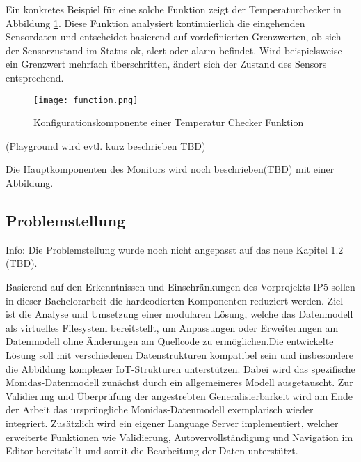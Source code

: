 Ein konkretes Beispiel für eine solche Funktion zeigt der Temperaturchecker in Abbildung \ref{fig:function}. Diese Funktion analysiert kontinuierlich die eingehenden Sensordaten und entscheidet basierend auf vordefinierten Grenzwerten, ob sich der Sensorzustand im Status ok, alert oder alarm befindet. Wird beispielsweise ein Grenzwert mehrfach überschritten, ändert sich der Zustand des Sensors entsprechend.

\begin{figure}[H]
  \centering
  \texttt{[image: function.png]}
  \caption{Konfigurationskomponente einer Temperatur Checker Funktion}
  \label{fig:function}
\end{figure}


(Playground wird evtl. kurz beschrieben TBD)

Die Hauptkomponenten des Monitors wird noch beschrieben(TBD) mit einer Abbildung. 



\subsection{Problemstellung}

Info: Die Problemstellung wurde noch nicht angepasst auf das neue Kapitel 1.2 (TBD).

Basierend auf den Erkenntnissen und Einschränkungen des Vorprojekts IP5 sollen in dieser Bachelorarbeit die hardcodierten Komponenten reduziert werden. Ziel ist die Analyse und Umsetzung einer modularen Lösung, welche das Datenmodell als virtuelles Filesystem bereitstellt, um Anpassungen oder Erweiterungen am Datenmodell ohne Änderungen am Quellcode zu ermöglichen.Die entwickelte Lösung soll mit verschiedenen Datenstrukturen kompatibel sein und insbesondere die Abbildung komplexer IoT-Strukturen unterstützen. Dabei wird das spezifische Monidas-Datenmodell zunächst durch ein allgemeineres Modell ausgetauscht. Zur Validierung und Überprüfung der angestrebten Generalisierbarkeit wird am Ende der Arbeit das ursprüngliche Monidas-Datenmodell exemplarisch wieder integriert. Zusätzlich wird ein eigener Language Server implementiert, welcher erweiterte Funktionen wie Validierung, Autovervollständigung und Navigation im Editor bereitstellt und somit die Bearbeitung der Daten  unterstützt.

